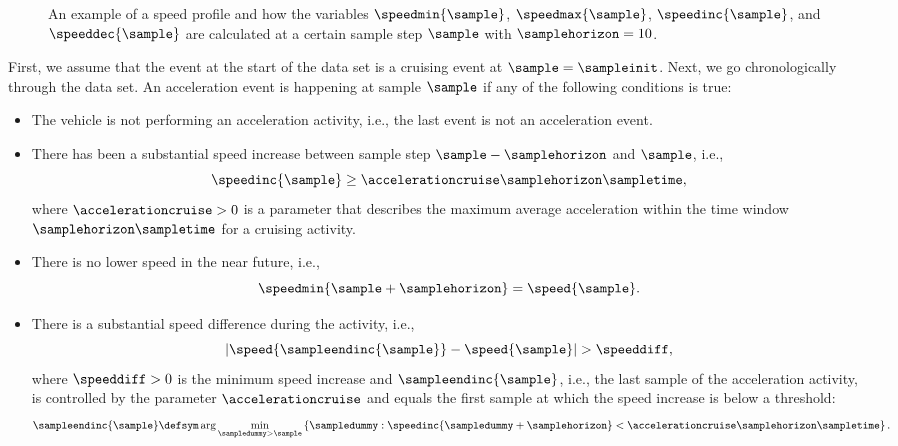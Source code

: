 \setlength{\figurewidth}{.9\linewidth}
\setlength{\figureheight}{.6\linewidth}
\begin{figure}
	\centering
	
	\caption{An example of a speed profile and how the variables $\speedmin{\sample}$, $\speedmax{\sample}$, $\speedinc{\sample}$, and $\speeddec{\sample}$ are calculated at a certain sample step $\sample$ with $\samplehorizon=10$.}
	\label{fig:explain symbols}
\end{figure}

First, we assume that the event at the start of the data set is a cruising event at $\sample=\sampleinit$. 
Next, we go chronologically through the data set. 
An acceleration event is happening at sample $\sample$ if any of the following conditions is true:
\begin{itemize}
	\item The vehicle is not performing an acceleration activity, i.e., the last event is not an acceleration event.
	\item There has been a substantial speed increase between sample step $\sample-\samplehorizon$ and $\sample$, i.e., 
	\begin{equation}
		\label{eq:start acceleration}
		\speedinc{\sample} \geq \accelerationcruise\samplehorizon\sampletime,
	\end{equation} 
	where $\accelerationcruise>0$ is a parameter that describes the maximum average acceleration within the time window $\samplehorizon\sampletime$ for a cruising activity. 
	\item There is no lower speed in the near future, i.e.,
	\begin{equation}
		\label{eq:acceleration condition}
		\speedmin{\sample+\samplehorizon}=\speed{\sample}.
	\end{equation}
	\item There is a substantial speed difference during the activity, i.e., 
	\begin{equation}
		\label{eq:end acceleration condition}
		\left|\speed{\sampleendinc{\sample}} - \speed{\sample}\right| > \speeddiff,
	\end{equation}
	where $\speeddiff>0$ is the minimum speed increase and $\sampleendinc{\sample}$, i.e., the last sample of the acceleration activity, is controlled by the parameter $\accelerationcruise$ and equals the first sample at which the speed increase is below a threshold:
	\begin{equation}
	\label{eq:end acceleration}
	\sampleendinc{\sample} \defsym \arg \min_{\sampledummy > \sample} \left\{ \sampledummy: \speedinc{\sampledummy+\samplehorizon} < \accelerationcruise\samplehorizon\sampletime \right\}.
	\end{equation}
\end{itemize}

